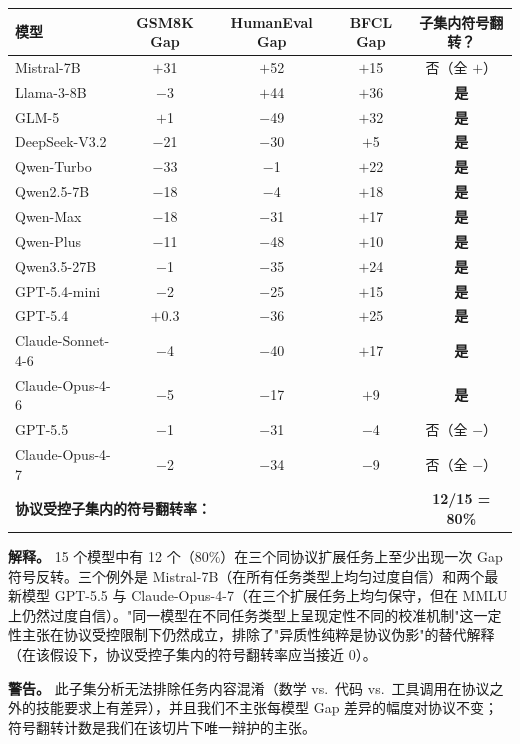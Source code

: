 \documentclass[11pt,a4paper,fontset=fandol]{ctexart}
\begin{document}
\begin{center}
\small
\begin{tabular}{l c c c c}
\toprule
\textbf{模型} & GSM8K Gap & HumanEval Gap & BFCL Gap & 子集内符号翻转？ \\
\midrule
Mistral-7B        & $+$31 & $+$52 & $+$15 & 否（全 $+$） \\
Llama-3-8B        & $-$3  & $+$44 & $+$36 & \textbf{是} \\
GLM-5             & $+$1  & $-$49 & $+$32 & \textbf{是} \\
DeepSeek-V3.2     & $-$21 & $-$30 & $+$5  & \textbf{是} \\
Qwen-Turbo        & $-$33 & $-$1  & $+$22 & \textbf{是} \\
Qwen2.5-7B        & $-$18 & $-$4  & $+$18 & \textbf{是} \\
Qwen-Max          & $-$18 & $-$31 & $+$17 & \textbf{是} \\
Qwen-Plus         & $-$11 & $-$48 & $+$10 & \textbf{是} \\
Qwen3.5-27B       & $-$1  & $-$35 & $+$24 & \textbf{是} \\
GPT-5.4-mini      & $-$2  & $-$25 & $+$15 & \textbf{是} \\
GPT-5.4           & $+$0.3 & $-$36 & $+$25 & \textbf{是} \\
Claude-Sonnet-4-6 & $-$4  & $-$40 & $+$17 & \textbf{是} \\
Claude-Opus-4-6   & $-$5  & $-$17 & $+$9  & \textbf{是} \\
GPT-5.5           & $-$1  & $-$31 & $-$4  & 否（全 $-$） \\
Claude-Opus-4-7   & $-$2  & $-$34 & $-$9  & 否（全 $-$） \\
\midrule
\multicolumn{4}{l}{\textbf{协议受控子集内的符号翻转率：}} & \textbf{12/15 = 80\%} \\
\bottomrule
\end{tabular}
\end{center}

\textbf{解释。} 15 个模型中有 12 个（80\%）在三个同协议扩展任务上至少出现一次 Gap 符号反转。三个例外是 Mistral-7B（在所有任务类型上均匀过度自信）和两个最新模型 GPT-5.5 与 Claude-Opus-4-7（在三个扩展任务上均匀保守，但在 MMLU 上仍然过度自信）。"同一模型在不同任务类型上呈现定性不同的校准机制"这一定性主张在协议受控限制下仍然成立，排除了"异质性纯粹是协议伪影"的替代解释（在该假设下，协议受控子集内的符号翻转率应当接近 $0$）。

\textbf{警告。} 此子集分析无法排除任务内容混淆（数学 vs.\ 代码 vs.\ 工具调用在协议之外的技能要求上有差异），并且我们不主张每模型 Gap 差异的幅度对协议不变；符号翻转计数是我们在该切片下唯一辩护的主张。
\end{document}
